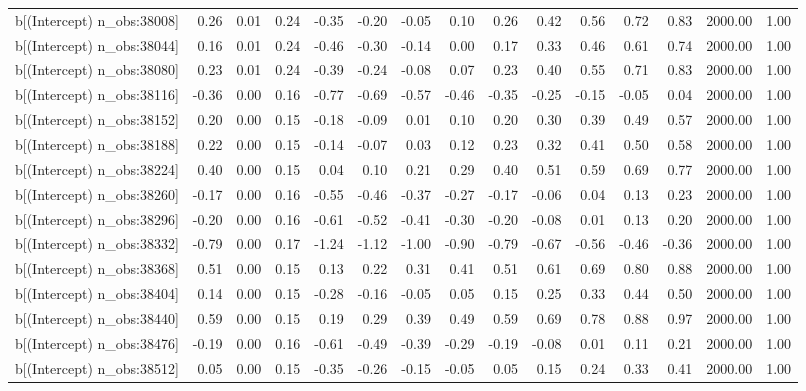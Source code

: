 \begin{table}[ht]
\begin{tabular}{rrrrrrrrrrrrrrr}
  b[(Intercept) n\_obs:38008] & 0.26 & 0.01 & 0.24 & -0.35 & -0.20 & -0.05 & 0.10 & 0.26 & 0.42 & 0.56 & 0.72 & 0.83 & 2000.00 & 1.00 \\ 
  b[(Intercept) n\_obs:38044] & 0.16 & 0.01 & 0.24 & -0.46 & -0.30 & -0.14 & 0.00 & 0.17 & 0.33 & 0.46 & 0.61 & 0.74 & 2000.00 & 1.00 \\ 
  b[(Intercept) n\_obs:38080] & 0.23 & 0.01 & 0.24 & -0.39 & -0.24 & -0.08 & 0.07 & 0.23 & 0.40 & 0.55 & 0.71 & 0.83 & 2000.00 & 1.00 \\ 
  b[(Intercept) n\_obs:38116] & -0.36 & 0.00 & 0.16 & -0.77 & -0.69 & -0.57 & -0.46 & -0.35 & -0.25 & -0.15 & -0.05 & 0.04 & 2000.00 & 1.00 \\ 
  b[(Intercept) n\_obs:38152] & 0.20 & 0.00 & 0.15 & -0.18 & -0.09 & 0.01 & 0.10 & 0.20 & 0.30 & 0.39 & 0.49 & 0.57 & 2000.00 & 1.00 \\ 
  b[(Intercept) n\_obs:38188] & 0.22 & 0.00 & 0.15 & -0.14 & -0.07 & 0.03 & 0.12 & 0.23 & 0.32 & 0.41 & 0.50 & 0.58 & 2000.00 & 1.00 \\ 
  b[(Intercept) n\_obs:38224] & 0.40 & 0.00 & 0.15 & 0.04 & 0.10 & 0.21 & 0.29 & 0.40 & 0.51 & 0.59 & 0.69 & 0.77 & 2000.00 & 1.00 \\ 
  b[(Intercept) n\_obs:38260] & -0.17 & 0.00 & 0.16 & -0.55 & -0.46 & -0.37 & -0.27 & -0.17 & -0.06 & 0.04 & 0.13 & 0.23 & 2000.00 & 1.00 \\ 
  b[(Intercept) n\_obs:38296] & -0.20 & 0.00 & 0.16 & -0.61 & -0.52 & -0.41 & -0.30 & -0.20 & -0.08 & 0.01 & 0.13 & 0.20 & 2000.00 & 1.00 \\ 
  b[(Intercept) n\_obs:38332] & -0.79 & 0.00 & 0.17 & -1.24 & -1.12 & -1.00 & -0.90 & -0.79 & -0.67 & -0.56 & -0.46 & -0.36 & 2000.00 & 1.00 \\ 
  b[(Intercept) n\_obs:38368] & 0.51 & 0.00 & 0.15 & 0.13 & 0.22 & 0.31 & 0.41 & 0.51 & 0.61 & 0.69 & 0.80 & 0.88 & 2000.00 & 1.00 \\ 
  b[(Intercept) n\_obs:38404] & 0.14 & 0.00 & 0.15 & -0.28 & -0.16 & -0.05 & 0.05 & 0.15 & 0.25 & 0.33 & 0.44 & 0.50 & 2000.00 & 1.00 \\ 
  b[(Intercept) n\_obs:38440] & 0.59 & 0.00 & 0.15 & 0.19 & 0.29 & 0.39 & 0.49 & 0.59 & 0.69 & 0.78 & 0.88 & 0.97 & 2000.00 & 1.00 \\ 
  b[(Intercept) n\_obs:38476] & -0.19 & 0.00 & 0.16 & -0.61 & -0.49 & -0.39 & -0.29 & -0.19 & -0.08 & 0.01 & 0.11 & 0.21 & 2000.00 & 1.00 \\ 
  b[(Intercept) n\_obs:38512] & 0.05 & 0.00 & 0.15 & -0.35 & -0.26 & -0.15 & -0.05 & 0.05 & 0.15 & 0.24 & 0.33 & 0.41 & 2000.00 & 1.00 \\ 

\end{tabular}
\end{table}
